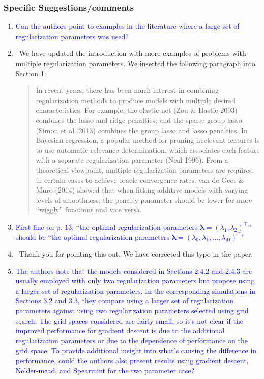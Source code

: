 \documentclass[]{article}
\newcommand{\point}[1]{\item \textcolor{blue}{#1}}
\newcommand{\reply}{\item[]\ }
\begin{document}
	\subsubsection*{Specific Suggestions/comments}
	
	\begin{enumerate}
		\point{Can the authors point to examples in the literature where a large set of regularization parameters was used?}
		
		\reply We have updated the introduction with more examples of problems with multiple regularization parameters. We inserted the following paragraph into Section 1:
		
		\begin{quote}
			In recent years, there has been much interest in combining regularization methods to produce models with multiple desired characteristics. For example, the elastic net (Zou \& Hastie 2003) combines the lasso and ridge penalties; and the sparse group lasso (Simon et al. 2013) combines the group lasso and lasso penalties. In Bayesian regression, a popular method for pruning irrelevant features is to use automatic relevance determination, which associates each feature with a separate regularization parameter (Neal 1996). From a theoretical viewpoint, multiple regularization parameters are required in certain cases to achieve oracle convergence rates. van de Geer \& Muro (2014) showed that when fitting additive models with varying levels of smoothness, the penalty parameter should be lower for more ``wiggly'' functions and vice versa. 
		\end{quote}
		
		\point{First line on p. 13, ``the optimal regularization parameters $\boldsymbol{\lambda} = (\lambda_1,\lambda_2)^\top$'' should be ``the optimal regularization parameters $\boldsymbol{\lambda} = (\lambda_0, \lambda_1, ... , \lambda_M)^\top$''}
		
		\reply Thank you for pointing this out. We have corrected this typo in the paper.
		
		\point{The authors note that the models considered in Sections 2.4.2 and 2.4.3 are usually employed with only two regularization parameters but propose using a larger set of regularization parameters. In the corresponding simulations in Sections 3.2 and 3.3, they compare using a larger set of regularization parameters against using two regularization parameters selected using grid search. The grid spaces considered are fairly small, so it’s not clear if the improved performance for gradient descent is due to the additional regularization parameters or due to the dependence of performance on the grid space. To provide additional insight into what’s causing the difference in performance, could the authors also present results using gradient descent, Nelder-mead, and Spearmint for the two parameter case?}
		

\end{enumerate}
\end{document}
